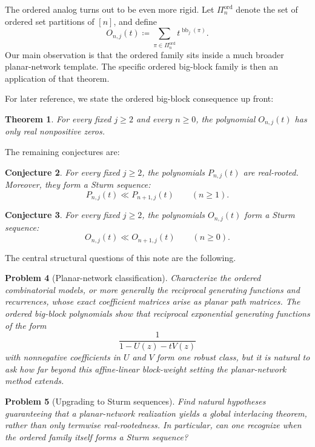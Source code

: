 \documentclass[11pt,reqno]{amsart}
\newtheorem{theorem}{Theorem}[section]
\newtheorem{conjecture}[theorem]{Conjecture}
\newtheorem{problem}[theorem]{Problem}
\theoremstyle{definition}
\newcommand{\interl}{\ll}
\begin{document}
The ordered analog turns out to be even more rigid. Let
$\Pi_n^{\operatorname{ord}}$ denote the set of ordered set partitions of
$[n]$, and define
\[
  O_{n,j}(t)
  \coloneqq
  \sum_{\pi \in \Pi_n^{\operatorname{ord}}}
  t^{\operatorname{bb}_j(\pi)}.
\]
Our main observation is that the ordered family sits inside a much broader
planar-network template. The specific ordered big-block family is then an
application of that theorem.

\medskip

For later reference, we state the ordered big-block consequence up front:

\begin{theorem}\label{thm:ordered_rr}
For every fixed $j \geq 2$ and every $n \geq 0$, the polynomial $O_{n,j}(t)$
has only real nonpositive zeros.
\end{theorem}

The remaining conjectures are:

\begin{conjecture}\label{conj:unordered_rr}
For every fixed $j \geq 2$, the polynomials $P_{n,j}(t)$ are real-rooted.
Moreover, they form a Sturm sequence:
\[
  P_{n,j}(t) \interl P_{n+1,j}(t)
  \qquad (n \geq 1).
\]
\end{conjecture}

\begin{conjecture}\label{conj:ordered_sturm}
For every fixed $j \geq 2$, the polynomials $O_{n,j}(t)$ form a Sturm
sequence:
\[
  O_{n,j}(t) \interl O_{n+1,j}(t)
  \qquad (n \geq 0).
\]
\end{conjecture}

The central structural questions of this note are the following.

\begin{problem}[Planar-network classification]\label{prob:classification}
Characterize the ordered combinatorial models, or more generally the
reciprocal generating functions and recurrences, whose exact coefficient
matrices arise as planar path matrices. The ordered big-block polynomials show
that reciprocal exponential generating functions of the form
\[
  \frac{1}{1-U(z)-tV(z)}
\]
with nonnegative coefficients in \(U\) and \(V\) form one robust class, but it
is natural to ask how far beyond this affine-linear block-weight setting the
planar-network method extends.
\end{problem}

\begin{problem}[Upgrading to Sturm sequences]\label{prob:sturm_upgrade}
Find natural hypotheses guaranteeing that a planar-network realization yields a
global interlacing theorem, rather than only termwise real-rootedness. In
particular, can one recognize when the ordered family itself forms a Sturm
sequence?
\end{problem}
\end{document}
